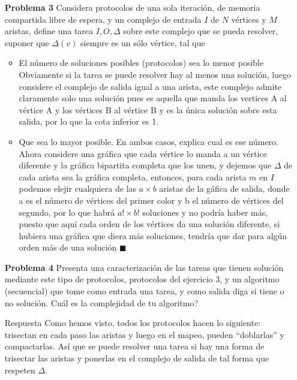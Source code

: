 \documentclass{article}
\begin{document}
\begin{enumerate}
\begin{itemize}
\end{itemize}

\item[\bf{Problema 3}]  Considera protocolos de una sola iteración, de memoria compartida libre de espera, y un complejo de entrada $I$ de $N$ vértices y $M$ aristas, define una tarea $I,O,\Delta$ sobre este complejo que se pueda resolver, suponer que $\Delta(v)$ siempre es un sólo vértice, tal que

\begin{itemize}
\item El número de soluciones posibles (protocolos) sea lo menor posible\\
Obviamente si la tarea se puede resolver hay al menos una solución, luego considere el complejo de salida igual a una arista, este complejo admite claramente solo una solución pues es aquella que manda los vertices A al vértice A y los vértices B al vértice B y es la única solución sobre esta salida, por lo que la cota inferior es 1.
\item Que sea lo mayor posible. En ambos casos, explica cual es ese número.
Ahora considere una gráfica que cada vértice lo manda a un vértice diferente y la gráfica bipartita completa que los unen, y dejemos que $\Delta$ de cada arista sea la gráfica completa, entonces, para cada arista $m$ en $I$ podemos elejir cualquiera de las $a \times b$ aristas de la gáfica de salida, donde a es el número de vértices del primer color y b el número de vértices del segundo, por lo que habrá $a! \times b!$ soluciones y no podría haber más, puesto que aquí cada orden de los vértices da una solución diferente, si hubiera una gráfica que diera más soluciones, tendría que dar para algún orden más de una solución $\blacksquare$
\end{itemize}

\item[\bf{Problema 4}] Presenta una caracterización de las tareas que tienen solución mediante este tipo de protocolos, protocolos del ejercicio 3, y un algoritmo (secuencial) que tome como entrada una tarea, y como salida diga si tiene o no solución. Cuál es la complejidad de tu algoritmo?

\item[{Respuesta}] Como hemos visto, todos los protocolos hacen lo siguiente:
trisectan en cada paso las aristas y luego en el mapeo, pueden ``doblarlas'' y compactarlas. Así que se puede resolver una tarea si hay una forma de trisectar las aristas y ponerlas en el complejo de salida de tal forma que respeten $\Delta$.


\end{enumerate}
\end{document}
